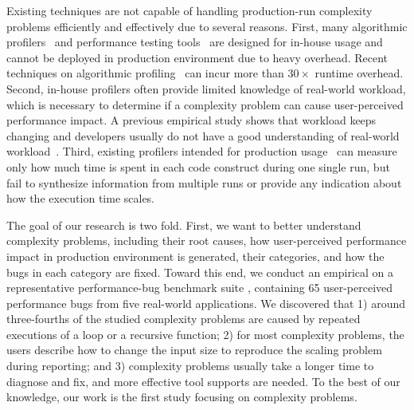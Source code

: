 Existing techniques
are not capable of handling production-run complexity problems
efficiently and effectively due to several reasons. 
First, many algorithmic profilers~\cite{Aprof1,Aprof2,AlgoProf} and performance 
testing tools~\cite{Alabama,PerfBlower} are designed for in-house usage and cannot be 
deployed in production environment due to heavy overhead. 
Recent techniques on algorithmic 
profiling~\cite{Aprof1,Aprof2,AlgoProf} can incur more than $30\times$ runtime overhead.
Second, in-house profilers often  provide limited knowledge of real-world workload, which is necessary 
to determine if a complexity problem can cause user-perceived performance 
impact. A previous empirical study shows that workload keeps changing and 
developers usually do not have a good understanding of real-world workload~\citep{PerfBug}.  
Third, existing profilers intended for production usage~\cite{gprof,oprofile,LagHunter,IntroPerf}
can measure only how much time 
is spent in each code construct during one single run,
but fail to synthesize information from multiple runs
or provide any indication about how the execution time scales.


%
The goal of our research is two fold. First, we want to better 
understand  complexity problems, including 
their root causes, how user-perceived performance impact 
in production environment is generated,
their categories, 
and how the bugs in each category are
fixed.  Toward this end, 
we conduct an empirical on a representative
performance-bug benchmark suite \cite{PerfBug,SongOOPSLA2014},
containing 65 user-perceived  performance bugs from five
real-world applications.  We discovered that 
1) around three-fourths of the studied complexity problems are
caused by repeated executions of a loop or a recursive function;
2) for most complexity problems,
the users describe how to change the input size to reproduce the scaling problem during reporting;
and 3) complexity problems usually take a longer time to diagnose and fix,
and more effective tool supports are needed. 
To the best of our knowledge, our work is the first study focusing on complexity problems.



